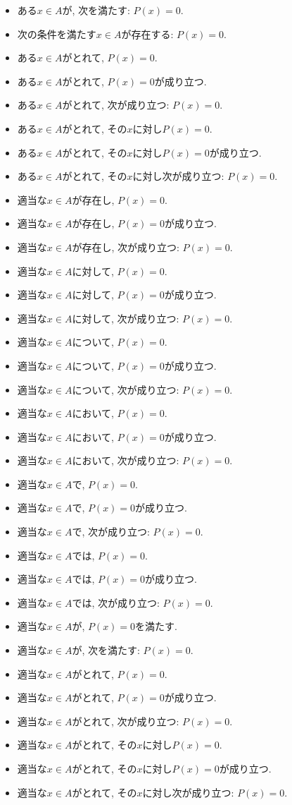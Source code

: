 \documentclass[a4paper,12pt,draft]{amsart}
\begin{document}
\begin{itemize}
\item ある$x\in A$が, 次を満たす: $P(x)=0$.
\item 次の条件を満たす$x\in A$が存在する: $P(x)=0$.
\item ある$x\in A$がとれて, $P(x)=0$.
\item ある$x\in A$がとれて, $P(x)=0$が成り立つ.
\item ある$x\in A$がとれて, 次が成り立つ: $P(x)=0$.
\item ある$x\in A$がとれて, その$x$に対し$P(x)=0$.
\item ある$x\in A$がとれて, その$x$に対し$P(x)=0$が成り立つ.
\item ある$x\in A$がとれて, その$x$に対し次が成り立つ: $P(x)=0$.
\item 適当な$x\in A$が存在し, $P(x)=0$.
\item 適当な$x\in A$が存在し, $P(x)=0$が成り立つ.
\item 適当な$x\in A$が存在し, 次が成り立つ: $P(x)=0$.
\item 適当な$x\in A$に対して, $P(x)=0$.
\item 適当な$x\in A$に対して, $P(x)=0$が成り立つ.
\item 適当な$x\in A$に対して, 次が成り立つ: $P(x)=0$.
\item 適当な$x\in A$について, $P(x)=0$.
\item 適当な$x\in A$について, $P(x)=0$が成り立つ.
\item 適当な$x\in A$について, 次が成り立つ: $P(x)=0$.
\item 適当な$x\in A$において, $P(x)=0$.
\item 適当な$x\in A$において, $P(x)=0$が成り立つ.
\item 適当な$x\in A$において, 次が成り立つ: $P(x)=0$.
\item 適当な$x\in A$で, $P(x)=0$.
\item 適当な$x\in A$で, $P(x)=0$が成り立つ.
\item 適当な$x\in A$で, 次が成り立つ: $P(x)=0$.
\item 適当な$x\in A$では, $P(x)=0$.
\item 適当な$x\in A$では, $P(x)=0$が成り立つ.
\item 適当な$x\in A$では, 次が成り立つ: $P(x)=0$.
\item 適当な$x\in A$が, $P(x)=0$を満たす.
\item 適当な$x\in A$が, 次を満たす: $P(x)=0$.
\item 適当な$x\in A$がとれて, $P(x)=0$.
\item 適当な$x\in A$がとれて, $P(x)=0$が成り立つ.
\item 適当な$x\in A$がとれて, 次が成り立つ: $P(x)=0$.
\item 適当な$x\in A$がとれて, その$x$に対し$P(x)=0$.
\item 適当な$x\in A$がとれて, その$x$に対し$P(x)=0$が成り立つ.
\item 適当な$x\in A$がとれて, その$x$に対し次が成り立つ: $P(x)=0$.
\end{itemize}
\end{document}
